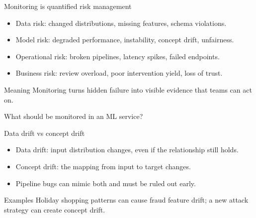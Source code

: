 \begin{frame}{Monitoring is quantified risk management}
\begin{itemize}
\item Data risk: changed distributions, missing features, schema violations.
\item Model risk: degraded performance, instability, concept drift, unfairness.
\item Operational risk: broken pipelines, latency spikes, failed endpoints.
\item Business risk: review overload, poor intervention yield, loss of trust.
\end{itemize}
\begin{block}{Meaning}
Monitoring turns hidden failure into visible evidence that teams can act on.
\end{block}
\coursefooter
\end{frame}

\begin{frame}{What should be monitored in an ML service?}
\centering
{}
\coursefooter
\end{frame}

\begin{frame}{Data drift vs concept drift}
\begin{itemize}
\item Data drift: input distribution changes, even if the relationship still holds.
\item Concept drift: the mapping from input to target changes.
\item Pipeline bugs can mimic both and must be ruled out early.
\end{itemize}
\begin{block}{Examples}
Holiday shopping patterns can cause fraud feature drift; a new attack strategy can create concept drift.
\end{block}
\coursefooter
\end{frame}


